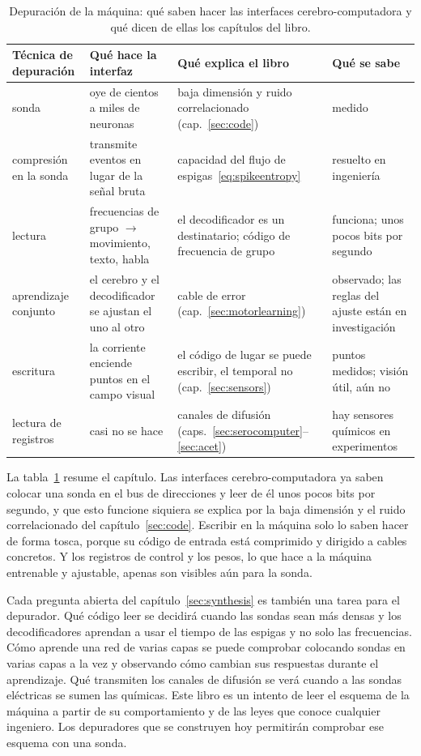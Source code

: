 \begin{table}[t]
\centering
\footnotesize
\setlength{\tabcolsep}{4pt}
\renewcommand{\arraystretch}{1.15}
\begin{tabular}{>{\raggedright}p{2.2cm}>{\raggedright}p{3.6cm}>{\raggedright}p{3.4cm}>{\raggedright\arraybackslash}p{4.0cm}}
\toprule
Técnica de depuración & Qué hace la interfaz & Qué explica el libro & Qué se sabe \\
\midrule
sonda & oye de cientos a miles de neuronas & baja dimensión y ruido correlacionado (cap.~\ref{sec:code}) & medido \\
compresión en la sonda & transmite eventos en lugar de la señal bruta & capacidad del flujo de espigas~\eqref{eq:spikeentropy} & resuelto en ingeniería \\
lectura & frecuencias de grupo $\to$ movimiento, texto, habla & el decodificador es un destinatario; código de frecuencia de grupo & funciona; unos pocos bits por segundo \\
aprendizaje conjunto & el cerebro y el decodificador se ajustan el uno al otro & cable de error (cap.~\ref{sec:motorlearning}) & observado; las reglas del ajuste están en investigación \\
escritura & la corriente enciende puntos en el campo visual & el código de lugar se puede escribir, el temporal no (cap.~\ref{sec:sensors}) & puntos medidos; visión útil, aún no \\
lectura de registros & casi no se hace & canales de difusión (caps.~\ref{sec:serocomputer}--\ref{sec:acet}) & hay sensores químicos en experimentos \\
\bottomrule
\end{tabular}
\caption{Depuración de la máquina: qué saben hacer las interfaces cerebro-computadora y qué dicen de ellas los capítulos del libro.}
\label{tab:debugging}
\end{table}

La tabla~\ref{tab:debugging} resume el capítulo. Las interfaces cerebro-computadora ya saben colocar una sonda en el bus de direcciones y leer de él unos pocos bits por segundo, y que esto funcione siquiera se explica por la baja dimensión y el ruido correlacionado del capítulo~\ref{sec:code}. Escribir en la máquina solo lo saben hacer de forma tosca, porque su código de entrada está comprimido y dirigido a cables concretos. Y los registros de control y los pesos, lo que hace a la máquina entrenable y ajustable, apenas son visibles aún para la sonda.

Cada pregunta abierta del capítulo~\ref{sec:synthesis} es también una tarea para el depurador. Qué código leer se decidirá cuando las sondas sean más densas y los decodificadores aprendan a usar el tiempo de las espigas y no solo las frecuencias. Cómo aprende una red de varias capas se puede comprobar colocando sondas en varias capas a la vez y observando cómo cambian sus respuestas durante el aprendizaje. Qué transmiten los canales de difusión se verá cuando a las sondas eléctricas se sumen las químicas. Este libro es un intento de leer el esquema de la máquina a partir de su comportamiento y de las leyes que conoce cualquier ingeniero. Los depuradores que se construyen hoy permitirán comprobar ese esquema con una sonda.

